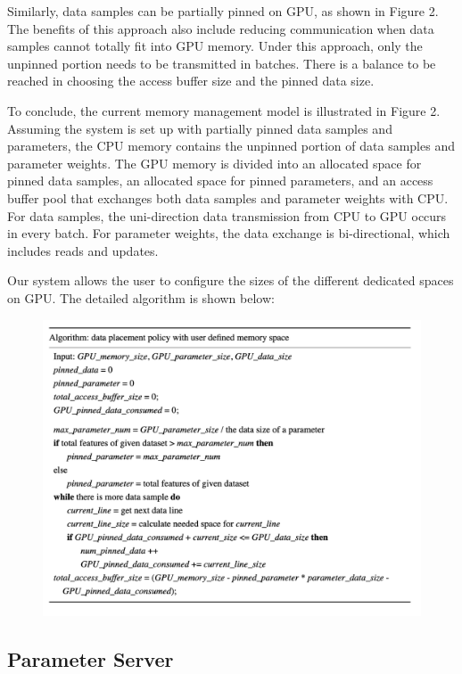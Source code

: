 \documentclass{article}
\begin{document}
Similarly, data samples can be partially pinned on GPU, as shown in Figure 2. The benefits of this approach also include reducing communication when data samples cannot totally fit into GPU memory. Under this approach, only the unpinned portion needs to be transmitted in batches. There is a balance to be reached in choosing the access buffer size and the pinned data size. 

To conclude, the current memory management model is illustrated in Figure 2. Assuming the system is set up with partially pinned data samples and parameters, the CPU memory contains the unpinned portion of data samples and parameter weights. The GPU memory is divided into an allocated space for pinned data samples, an allocated space for pinned parameters, and an access buffer pool that exchanges both data samples and parameter weights with CPU. For data samples, the uni-direction data transmission from CPU to GPU occurs in every batch. For parameter weights, the data exchange is bi-directional, which includes reads and updates. 

Our system allows the user to configure the sizes of the different dedicated spaces on GPU. The detailed algorithm is shown below:

\begin{figure}[htp]
    \centering
    \includegraphics[width=14cm]{memory_management_policy.png}
\end{figure}

\subsection*{Parameter Server}
\end{document}
